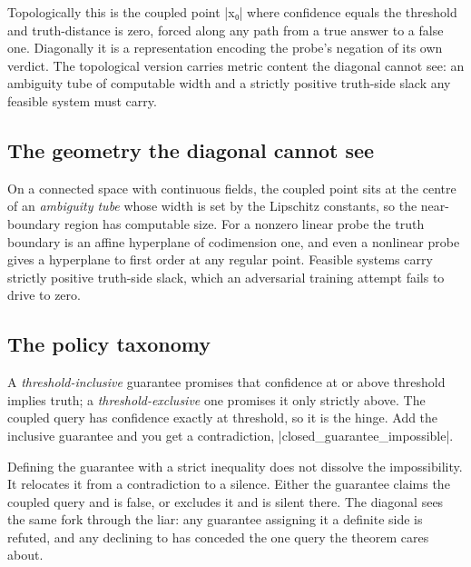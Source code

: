 \documentclass{memoir}
\begin{document}
Topologically this is the coupled point \LeanVerb|x₀| where confidence equals the
threshold and truth-distance is zero, forced along any path from a true answer
to a false one. Diagonally it is a representation encoding the probe's negation
of its own verdict. The topological version carries metric content the diagonal
cannot see: an ambiguity tube of computable width and a strictly positive
truth-side slack any feasible system must carry.



\subsection{The geometry the diagonal cannot see}\label{Two--Schemas--of--Impossibility-005F-005F-005F--Machine--Checked--Limits--of--Trustworthy--Machine--Learning-005F-005F-005F--and--Why--They--Tighten--with--Capability----Three--Trilemmata-005F-005F-005F--One--Theorem----The--Coupling--Theorem----The--geometry--the--diagonal--cannot--see}

On a connected space with continuous fields, the coupled point sits at the
centre of an \emph{ambiguity tube} whose width is set by the Lipschitz constants, so
the near-boundary region has computable size. For a nonzero linear probe the
truth boundary is an affine hyperplane of codimension one, and even a nonlinear
probe gives a hyperplane to first order at any regular point. Feasible systems
carry strictly positive truth-side slack, which an adversarial training attempt
fails to drive to zero.



\subsection{The policy taxonomy}\label{Two--Schemas--of--Impossibility-005F-005F-005F--Machine--Checked--Limits--of--Trustworthy--Machine--Learning-005F-005F-005F--and--Why--They--Tighten--with--Capability----Three--Trilemmata-005F-005F-005F--One--Theorem----The--Coupling--Theorem----The--policy--taxonomy}

A \emph{threshold-inclusive} guarantee promises that confidence at or above threshold
implies truth; a \emph{threshold-exclusive} one promises it only strictly above. The
coupled query has confidence exactly at threshold, so it is the hinge. Add the
inclusive guarantee and you get a contradiction, \LeanVerb|closed_guarantee_impossible|.

Defining the guarantee with a strict inequality does not dissolve the
impossibility. It relocates it from a contradiction to a silence. Either the
guarantee claims the coupled query and is false, or excludes it and is silent
there. The diagonal sees the same fork through the liar: any guarantee assigning
it a definite side is refuted, and any declining to has conceded the one query
the theorem cares about.
\end{document}
